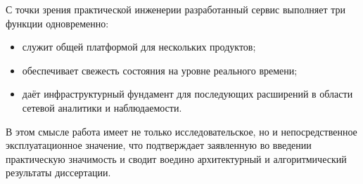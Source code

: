 С точки зрения практической инженерии разработанный сервис
выполняет три функции одновременно:

\begin{itemize}
\item служит общей платформой для нескольких продуктов;
\item обеспечивает свежесть состояния на уровне реального времени;
\item даёт инфраструктурный фундамент для последующих расширений в
области сетевой аналитики и наблюдаемости.
\end{itemize}

В этом смысле работа имеет не только исследовательское, но и
непосредственное эксплуатационное значение, что подтверждает
заявленную во введении практическую значимость и сводит воедино
архитектурный и алгоритмический результаты диссертации.

